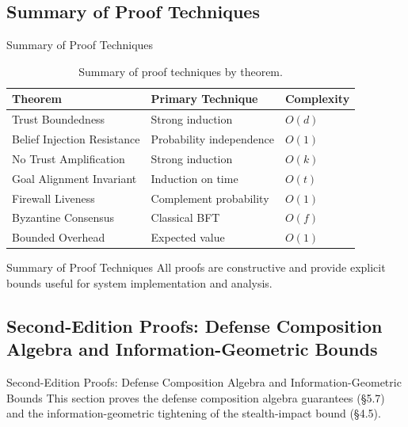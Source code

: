 \documentclass[
  ignorenonframetext,
]{beamer}
\begin{document}
\begin{frame}
\end{frame}

\subsection{Summary of Proof Techniques}\label{sec:proof-summary}

\begin{frame}[allowframebreaks]{Summary of Proof Techniques}
\begin{table}[htbp]
\centering
\caption{Summary of proof techniques by theorem.}
\label{tab:proof-summary}
\begin{tabular}{@{}lll@{}}
\toprule
Theorem & Primary Technique & Complexity \\
\midrule
Trust Boundedness & Strong induction & $O(d)$ \\
Belief Injection Resistance & Probability independence & $O(1)$ \\
No Trust Amplification & Strong induction & $O(k)$ \\
Goal Alignment Invariant & Induction on time & $O(t)$ \\
Firewall Liveness & Complement probability & $O(1)$ \\
Byzantine Consensus & Classical BFT & $O(f)$ \\
Bounded Overhead & Expected value & $O(1)$ \\
\bottomrule
\end{tabular}
\end{table}

\end{frame}

\begin{frame}[allowframebreaks]{Summary of Proof Techniques}
All proofs are constructive and provide explicit bounds useful for
system implementation and analysis.
\end{frame}

\begin{frame}
\end{frame}

\subsection{Second-Edition Proofs: Defense Composition Algebra and
Information-Geometric Bounds}\label{sec:v2-proofs}

\begin{frame}[allowframebreaks]{Second-Edition Proofs: Defense
Composition Algebra and Information-Geometric Bounds}
This section proves the defense composition algebra guarantees
(§5.7) and the information-geometric
tightening of the stealth-impact bound (§4.5).
\end{frame}
\end{document}
